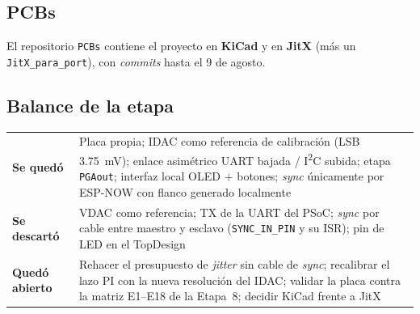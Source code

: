 \subsection{PCBs}

El repositorio \texttt{PCBs} contiene el proyecto en \textbf{KiCad} y en
\textbf{JitX} (m\'as un \texttt{JitX\_para\_port}), con \emph{commits} hasta el
9 de agosto.


\subsection{Balance de la etapa}

\begin{center}\small
\begin{tabularx}{\textwidth}{@{}l X@{}}
\toprule
\textbf{Se qued\'o} & Placa propia; IDAC como referencia de calibraci\'on (LSB \SI{3.75}{\milli\volt}); enlace asim\'etrico UART bajada / I\textsuperscript{2}C subida; etapa \texttt{PGAout}; interfaz local OLED $+$ botones; \emph{sync} \'unicamente por ESP-NOW con flanco generado localmente \\
\addlinespace[3pt]
\textbf{Se descart\'o} & VDAC como referencia; TX de la UART del PSoC; \emph{sync} por cable entre maestro y esclavo (\texttt{SYNC\_IN\_PIN} y su ISR); pin de LED en el TopDesign \\
\addlinespace[3pt]
\textbf{Qued\'o abierto} & Rehacer el presupuesto de \emph{jitter} sin cable de \emph{sync}; recalibrar el lazo PI con la nueva resoluci\'on del IDAC; validar la placa contra la matriz E1--E18 de la Etapa~8; decidir KiCad frente a JitX \\
\bottomrule
\end{tabularx}
\end{center}
